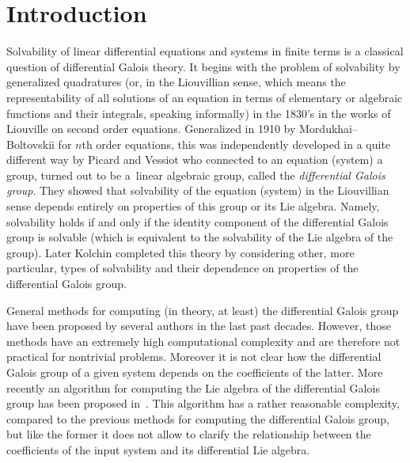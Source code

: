 \documentclass[pdftex]{sigma}
\numberwithin{equation}{section}
\begin{document}


\renewcommand{\thefootnote}{\arabic{footnote}}
\setcounter{footnote}{0}

\section{Introduction}

Solvability of linear differential equations and systems in finite terms is a classical question of
differential Galois theory. It begins with the problem of solvability by generalized quadratures
(or, in the Liouvillian sense, which means the representability of all solutions of an equation in
terms of elementary or algebraic functions and their integrals, speaking informally) in the 1830's
in the works of Liouville on second order equations. Generalized in 1910 by Mordukhai--Boltovskii for
$n$th order equations, this was independently developed in a quite different way by Picard and Vessiot
who connected to an equation (system) a group, turned out to be a~linear algebraic group, called the
{\it differential Galois group}. They showed that solvability of the equation (system) in the Liouvillian
sense depends entirely on properties of this group or its Lie algebra. Namely, solvability holds if and
only if the identity component of the differential Galois group is solvable (which is equivalent to the
solvability of the Lie algebra of the group). Later Kolchin completed this theory by considering other,
more particular, types of solvability and their dependence on properties of the differential Galois group.

General methods for computing (in theory, at least) the differential Galois group have been proposed by several authors \cite{CoSi99,Fe15a,Hr02,Ho07b} in the last past decades. However, those methods have an extremely high computational complexity and are therefore not practical for nontrivial problems. Moreover it is not clear how the differential Galois group of a given system depends on the coefficients of the latter. More recently an algorithm for computing the Lie algebra of the differential Galois group has been proposed in~\cite{BCDW16}. This algorithm has a rather reasonable complexity, compared to the previous methods for computing the differential Galois group, but like the former it does not allow to clarify the relationship between the coefficients of the input system and its differential Lie algebra.
\end{document}
